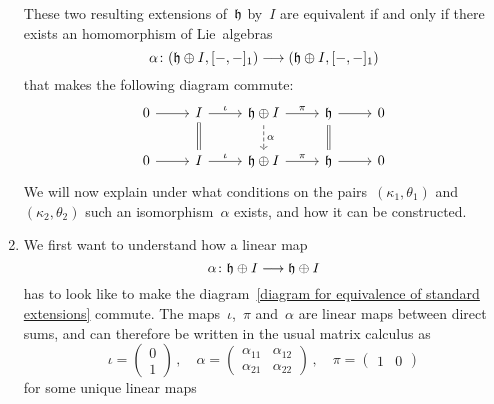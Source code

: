\begin{fluff}
\begin{enumerate}[resume*]
      These two resulting extensions of~$\mathfrak{h}$ by~$I$ are equivalent if and only if there exists an homomorphism of Lie~algebras
      \[
        \alpha
        \colon
        ( \hlie \oplus I, [-,-]_1 )
        \to
        ( \hlie \oplus I, [-,-]_1 )
      \]
      that makes the following diagram commute:
      \begin{equation}
        \label{diagram for equivalence of standard extensions}
        \begin{tikzcd}
          0
          \arrow{r}
          &
          I
          \arrow{r}[above]{\iota}
          \arrow[equal]{d}
          &
          \hlie \oplus I
          \arrow{r}[above]{\pi}
          \arrow[dashed]{d}[right]{\alpha}
          &
          \hlie
          \arrow{r}
          \arrow[equal]{d}
          &
          0
          \\
          0
          \arrow{r}
          &
          I
          \arrow{r}[above]{\iota}
          &
          \hlie \oplus I
          \arrow{r}[above]{\pi}
          &
          \hlie
          \arrow{r}
          &
          0
        \end{tikzcd}
      \end{equation}
      We will now explain under what conditions on the pairs~$(\kappa_1, \theta_1)$ and~$(\kappa_2, \theta_2)$ such an isomorphism~$\alpha$ exists, and how it can be constructed.
    \item
      We first want to understand how a linear map
      \[
        \alpha
        \colon
        \hlie \oplus I
        \to
        \hlie \oplus I
      \]
      has to look like to make the diagram~\eqref{diagram for equivalence of standard extensions} commute.
      The maps~$\iota$,~$\pi$ and~$\alpha$ are linear maps between direct sums, and can therefore be written in the usual matrix calculus as
      \[
        \iota
        =
        \begin{pmatrix}
          0
          \\
          1
        \end{pmatrix} \,,
        \quad
        \alpha
        =
        \begin{pmatrix}
          \alpha_{11} & \alpha_{12} \\
          \alpha_{21} & \alpha_{22}
        \end{pmatrix} \,,
        \quad
        \pi
        =
        \begin{pmatrix}
          1 & 0
        \end{pmatrix}
      \]
      for some unique linear maps

\end{enumerate}
\end{fluff}
